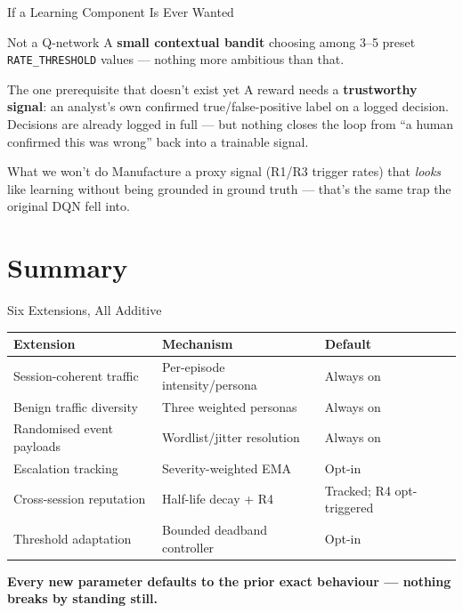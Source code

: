 \documentclass[aspectratio=169, 12pt]{beamer}
\begin{document}
\begin{frame}{If a Learning Component Is Ever Wanted}
  \begin{block}{Not a Q-network}
    A \textbf{small contextual bandit} choosing among 3--5 preset
    \texttt{RATE\_THRESHOLD} values — nothing more ambitious than that.
  \end{block}
  \vspace{0.3cm}
  \begin{exampleblock}{The one prerequisite that doesn't exist yet}
    A reward needs a \textbf{trustworthy signal}: an analyst's own
    confirmed true/false-positive label on a logged decision. Decisions
    are already logged in full — but nothing closes the loop from
    ``a human confirmed this was wrong'' back into a trainable signal.
  \end{exampleblock}
  \vspace{0.3cm}
  \begin{alertblock}{What we won't do}
    Manufacture a proxy signal (R1/R3 trigger rates) that \emph{looks}
    like learning without being grounded in ground truth — that's the
    same trap the original DQN fell into.
  \end{alertblock}
\end{frame}

\section{Summary}

\begin{frame}{Six Extensions, All Additive}
  \begin{center}
    \small
    \begin{tabular}{p{4.2cm}p{5.4cm}p{2.4cm}}
      \toprule
      \textbf{Extension} & \textbf{Mechanism} & \textbf{Default} \\
      \midrule
      Session-coherent traffic & Per-episode intensity/persona & Always on \\
      Benign traffic diversity & Three weighted personas & Always on \\
      Randomised event payloads & Wordlist/jitter resolution & Always on \\
      Escalation tracking & Severity-weighted EMA & Opt-in \\
      Cross-session reputation & Half-life decay + R4 & Tracked; R4 opt-triggered \\
      Threshold adaptation & Bounded deadband controller & Opt-in \\
      \bottomrule
    \end{tabular}
  \end{center}
  \vspace{0.4cm}
  \begin{center}
    \large\textcolor{honeyblue}{\textbf{Every new parameter defaults to the prior exact
    behaviour — nothing breaks by standing still.}}
  \end{center}
\end{frame}
\end{document}
